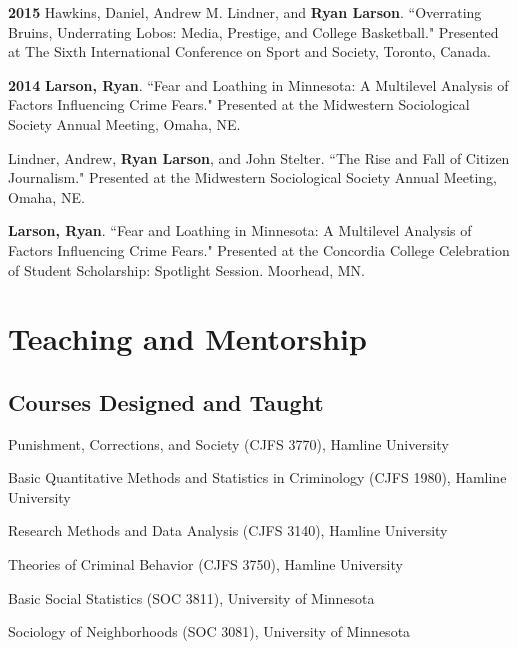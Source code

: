\documentclass[letterpaper]{article}
\newenvironment{publist}{%
  \begin{list}{}{%
    \setlength{\leftmargin}{0cm}   %
    \setlength{\labelwidth}{2cm}     %
    \setlength{\labelsep}{0.5cm}     %
  }%
}{%
  \end{list}%
}
\begin{document}
\begin{publist}
\item[\textbf{2015}] Hawkins, Daniel, Andrew M. Lindner, and \textbf{Ryan Larson}. ``Overrating Bruins, Underrating Lobos: Media, Prestige, and College Basketball." Presented at The Sixth International Conference on Sport and Society, Toronto, Canada.

\item[\textbf{2014}] \textbf{Larson, Ryan}. ``Fear and Loathing in Minnesota: A Multilevel Analysis of Factors Influencing Crime Fears." Presented at the Midwestern Sociological Society Annual Meeting, Omaha, NE.

\item Lindner, Andrew, \textbf{Ryan Larson}, and John Stelter. ``The Rise and Fall of Citizen Journalism." Presented at the Midwestern Sociological Society Annual Meeting, Omaha, NE. 

\item \textbf{Larson, Ryan}. ``Fear and Loathing in Minnesota: A Multilevel Analysis of Factors Influencing Crime Fears." Presented at the Concordia College Celebration of Student Scholarship: Spotlight Session. Moorhead, MN. 


\end{publist}


\section*{\textbf{Teaching and Mentorship}}

\subsection*{Courses Designed and Taught}


\begin{publist} 

\item Punishment, Corrections, and Society (CJFS 3770), Hamline University
\item Basic Quantitative Methods and Statistics in Criminology (CJFS 1980), Hamline University
\item Research Methods and Data Analysis (CJFS 3140), Hamline University
\item Theories of Criminal Behavior (CJFS 3750), Hamline University
\item Basic Social Statistics (SOC 3811), University of Minnesota
\item Sociology of Neighborhoods (SOC 3081), University of Minnesota

\end{publist}
\end{document}
